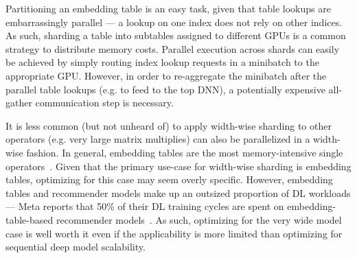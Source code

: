 Partitioning an embedding table is an easy task, given that table lookups are embarrassingly parallel --- a lookup on one index does not rely on other indices. As such, sharding a table into subtables assigned to different GPUs is a common strategy to distribute memory costs. Parallel execution across shards can easily be achieved by simply routing index lookup requests in a minibatch to the appropriate GPU. However, in order to re-aggregate the minibatch after the parallel table lookups (e.g. to feed to the top DNN), a potentially expensive all-gather communication step is necessary.

It is less common (but not unheard of) to apply width-wise sharding to other operators (e.g. very large matrix multiplies) can also be parallelized in a width-wise fashion. In general, embedding tables are the most memory-intensive single operators~\cite{dlrmscale2020}. Given that the primary use-case for width-wise sharding is embedding tables, optimizing for this case may seem overly specific. However, embedding tables and recommender models make up an outsized proportion of DL workloads --- Meta reports that 50\% of their DL training cycles are spent on embedding-table-based recommender models~\cite{dlrmscale2020}. As such, optimizing for the very wide model case is well worth it even if the applicability is more limited than optimizing for sequential deep model scalability.